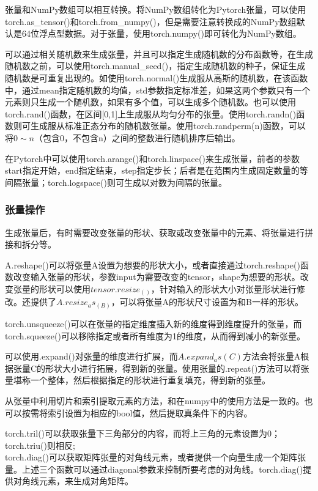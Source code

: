 \documentclass[cn,hazy,blue,14pt,screen]{elegantnote}
\begin{document}
张量和NumPy数组可以相互转换。将NumPy数组转化为Pytorch张量，可以使用torch.as\_tensor()和torch.from\_numpy()，但是需要注意转换成的NumPy数组默认是64位浮点型数据。对于张量，使用torch.numpy()即可转化为NumPy数组。

可以通过相关随机数来生成张量，并且可以指定生成随机数的分布函数等，在生成随机数之前，可以使用torch.manual\_seed()，指定生成随机数的种子，保证生成随机数是可重复出现的。如使用torch.normal()生成服从高斯的随机数，在该函数中，通过mean指定随机数的均值，std参数指定标准差，如果这两个参数只有一个元素则只生成一个随机数，如果有多个值，可以生成多个随机数。也可以使用torch.rand()函数，在区间[0,1]上生成服从均匀分布的张量。使用torch.randn()函数则可生成服从标准正态分布的随机数张量。使用torch.randperm(n)函数，可以将$0\sim n$（包含0，不包含n）之间的整数进行随机排序后输出。

在Pytorch中可以使用torch.arange()和torch.linspace()来生成张量，前者的参数start指定开始，end指定结束，step指定步长；后者是在范围内生成固定数量的等间隔张量；torch.logspace()则可生成以对数为间隔的张量。

\subsubsection{张量操作}

生成张量后，有时需要改变张量的形状、获取或改变张量中的元素、将张量进行拼接和拆分等。

A.reshape()可以将张量A设置为想要的形状大小，或者直接通过torch.reshape()函数改变输入张量的形状，参数input为需要改变的tensor，shape为想要的形状。改变张量的形状可以使用$tensor.resize_()$，针对输入的形状大小对张量形状进行修改。还提供了$A.resize_as_(B)$，可以将张量A的形状尺寸设置为和B一样的形状。

torch.unsqueeze()可以在张量的指定维度插入新的维度得到维度提升的张量，而torch.squeeze()可以移除指定或者所有维度为1的维度，从而得到减小的新张量。

可以使用.expand()对张量的维度进行扩展，而$A.expand_as(C)$方法会将张量A根据张量C的形状大小进行拓展，得到新的张量。使用张量的.repeat()方法可以将张量堪称一个整体，然后根据指定的形状进行重复填充，得到新的张量。

从张量中利用切片和索引提取元素的方法，和在numpy中的使用方法是一致的。也可以按需将索引设置为相应的bool值，然后提取真条件下的内容。

torch.tril()可以获取张量下三角部分的内容，而将上三角的元素设置为0；torch.triu()则相反;\\torch.diag()可以获取矩阵张量的对角线元素，或者提供一个向量生成一个矩阵张量。上述三个函数可以通过diagonal参数来控制所要考虑的对角线。torch.diag()提供对角线元素，来生成对角矩阵。
\end{document}
